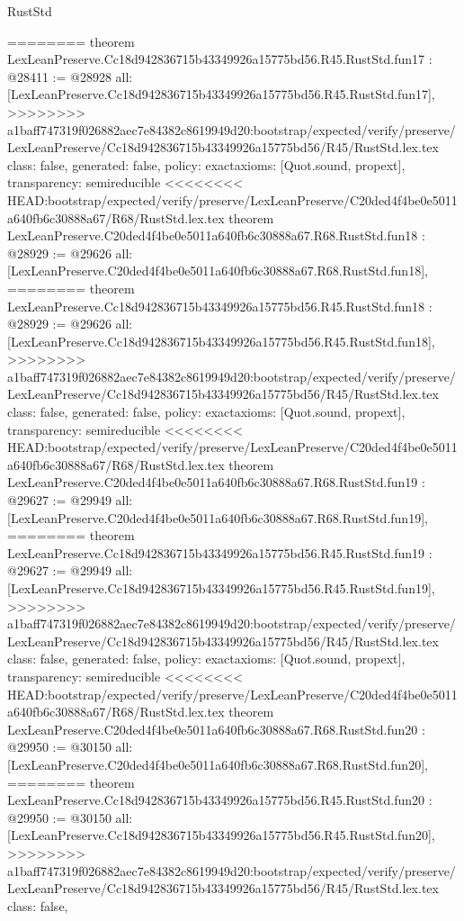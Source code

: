 \begin{lexlean}{RustStd}
\begin{coremodule}
{\begin{coremodule}
{{{{{{{{{{{{{{{{{{{{========
theorem LexLeanPreserve.Cc18d942836715b43349926a15775bd56.R45.RustStd.fun17 : @28411 := @28928 {
  all: [LexLeanPreserve.Cc18d942836715b43349926a15775bd56.R45.RustStd.fun17],
>>>>>>>> a1baff747319f026882aec7e84382c8619949d20:bootstrap/expected/verify/preserve/LexLeanPreserve/Cc18d942836715b43349926a15775bd56/R45/RustStd.lex.tex
  class: false,
  generated: false,
  policy: exact{axioms: [Quot.sound, propext]},
  transparency: semireducible
}
<<<<<<<< HEAD:bootstrap/expected/verify/preserve/LexLeanPreserve/C20ded4f4be0e5011a640fb6c30888a67/R68/RustStd.lex.tex
theorem LexLeanPreserve.C20ded4f4be0e5011a640fb6c30888a67.R68.RustStd.fun18 : @28929 := @29626 {
  all: [LexLeanPreserve.C20ded4f4be0e5011a640fb6c30888a67.R68.RustStd.fun18],
========
theorem LexLeanPreserve.Cc18d942836715b43349926a15775bd56.R45.RustStd.fun18 : @28929 := @29626 {
  all: [LexLeanPreserve.Cc18d942836715b43349926a15775bd56.R45.RustStd.fun18],
>>>>>>>> a1baff747319f026882aec7e84382c8619949d20:bootstrap/expected/verify/preserve/LexLeanPreserve/Cc18d942836715b43349926a15775bd56/R45/RustStd.lex.tex
  class: false,
  generated: false,
  policy: exact{axioms: [Quot.sound, propext]},
  transparency: semireducible
}
<<<<<<<< HEAD:bootstrap/expected/verify/preserve/LexLeanPreserve/C20ded4f4be0e5011a640fb6c30888a67/R68/RustStd.lex.tex
theorem LexLeanPreserve.C20ded4f4be0e5011a640fb6c30888a67.R68.RustStd.fun19 : @29627 := @29949 {
  all: [LexLeanPreserve.C20ded4f4be0e5011a640fb6c30888a67.R68.RustStd.fun19],
========
theorem LexLeanPreserve.Cc18d942836715b43349926a15775bd56.R45.RustStd.fun19 : @29627 := @29949 {
  all: [LexLeanPreserve.Cc18d942836715b43349926a15775bd56.R45.RustStd.fun19],
>>>>>>>> a1baff747319f026882aec7e84382c8619949d20:bootstrap/expected/verify/preserve/LexLeanPreserve/Cc18d942836715b43349926a15775bd56/R45/RustStd.lex.tex
  class: false,
  generated: false,
  policy: exact{axioms: [Quot.sound, propext]},
  transparency: semireducible
}
<<<<<<<< HEAD:bootstrap/expected/verify/preserve/LexLeanPreserve/C20ded4f4be0e5011a640fb6c30888a67/R68/RustStd.lex.tex
theorem LexLeanPreserve.C20ded4f4be0e5011a640fb6c30888a67.R68.RustStd.fun20 : @29950 := @30150 {
  all: [LexLeanPreserve.C20ded4f4be0e5011a640fb6c30888a67.R68.RustStd.fun20],
========
theorem LexLeanPreserve.Cc18d942836715b43349926a15775bd56.R45.RustStd.fun20 : @29950 := @30150 {
  all: [LexLeanPreserve.Cc18d942836715b43349926a15775bd56.R45.RustStd.fun20],
>>>>>>>> a1baff747319f026882aec7e84382c8619949d20:bootstrap/expected/verify/preserve/LexLeanPreserve/Cc18d942836715b43349926a15775bd56/R45/RustStd.lex.tex
  class: false,
}}}}}}}}}}}}}}}}}}}}}}}}
\end{coremodule}}
\end{coremodule}
\end{lexlean}
